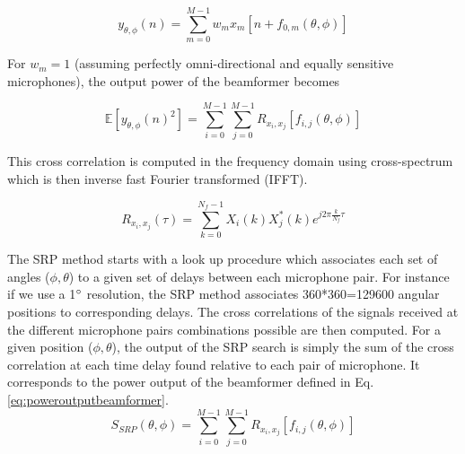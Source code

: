 \begin{equation}
    y_{\theta,\phi}(n)=\sum\limits_{m=0}^{M-1}{w_m x_m[n + f_{0,m}(\theta,\phi)]} 
\end{equation}


For $w_m=1$ (assuming perfectly omni-directional and equally sensitive microphones), the output power of the beamformer becomes

\begin{equation}
    \mathbb{E}[{y_{\theta,\phi}(n)^2}]=\sum\limits_{i=0}^{M-1}\sum\limits_{j=0}^{M-1}{R_{x_i,x_j}[f_{i,j}(\theta,\phi)]} 
    \label{eq:poweroutputbeamformer}
\end{equation}

This cross correlation is computed in the frequency domain using cross-spectrum which is then inverse fast Fourier transformed (IFFT).

\begin{equation}
    R_{x_i,x_j}(\tau)= \sum\limits_{k=0}^{N_{f}-1}{X_{i}(k)X_{j}^*(k)e^{j2\pi\frac{k}{N_{f}}\tau}}
\end{equation}


The SRP method starts with a look up procedure which associates each set of angles ($\phi,\theta$) to a given set of delays between each microphone pair. For instance if we use a 1$\degree$  resolution, the SRP method associates 360*360=129600 angular positions to corresponding delays. The cross correlations of the signals received at the different microphone pairs combinations possible are then computed. For a given position ($\phi,\theta$), the output of the SRP search is simply the sum of the cross correlation at each time delay found relative to each pair of microphone. It corresponds to the power output of the beamformer defined in Eq. \ref{eq:poweroutputbeamformer}. 
\begin{equation}
    S_{SRP}(\theta,\phi)=\sum\limits_{i=0}^{M-1}\sum\limits_{j=0}^{M-1}{R_{x_i,x_j}[f_{i,j}(\theta,\phi)]}
     \label{eq:srpSum}
\end{equation}

